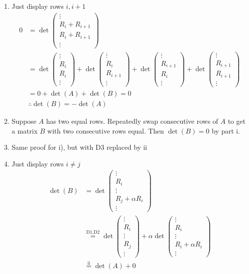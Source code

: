 \documentclass{report}
\theoremstyle{remark}
\theoremstyle{definition}
\theoremstyle{definition}
\theoremstyle{theorem}
\providecommand{\vectiv}[4]{\begin{pmatrix}#1\\#2\\#3\\#4\end{pmatrix}}
\begin{document}
\begin{enumerate}[label=\roman*]
    \item Just display rows $i, i+1$
    \begin{align*}
        0 &= \det\vectiv{\vdots}{R_i+R_{i+1}}{R_i+R_{i+1}}{\vdots}\\
        &=  \det\vectiv{\vdots}{R_i}{R_i}{\vdots} + \det\vectiv{\vdots}{R_{i}}{R_{i+1}}{\vdots} + \det\vectiv{\vdots}{R_{i+1}}{R_i}{\vdots} + \det\vectiv{\vdots}{R_{i+1}}{R_{i+1}}{\vdots}\\
        &= 0 +\det(A) + \det(B) = 0\\
        & \therefore \det(B) = -\det(A)
    \end{align*}
    \item Suppose $A$ has two equal rows. Repeatedly swap consecutive rows of $A$ to get a matrix $B$ with two consecutive rows equal. Then $\det(B)=0$ by part i. 
    \item Same proof for i), but with D3 replaced by ii
    \item Just display rows $i \neq j$
    \begin{align*}
        \det(B) &= \det\begin{pmatrix}
        \vdots\\
        R_i\\
        \vdots\\
        R_j + \alpha R_i\\
        \vdots
        \end{pmatrix}\\
        &\stackrel{\text{D1,D2}}{=}\det\begin{pmatrix}
        \vdots\\
        R_i\\
        \vdots\\
        R_j\\
        \vdots
        \end{pmatrix} + \alpha\det\begin{pmatrix}
        \vdots\\
        R_i\\
        \vdots\\
        R_i + \alpha R_i\\
        \vdots
        \end{pmatrix}\\
        &\stackrel{\text{ii}}{=} \det(A)+0
    \end{align*}
\end{enumerate}\par
\end{document}
